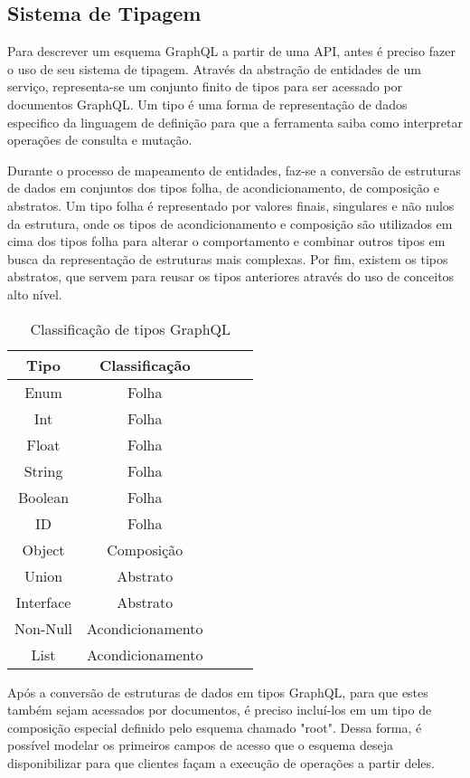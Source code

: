 \subsection[Sistema de Tipagem]{Sistema de Tipagem}

Para descrever um esquema GraphQL a partir de uma API, antes é preciso fazer o uso de seu sistema de tipagem. Através da abstração de entidades de um serviço, representa-se um conjunto finito de tipos para ser acessado por documentos GraphQL. Um tipo é uma forma de representação de dados especifico da linguagem de definição para que a ferramenta saiba como interpretar operações de consulta e mutação.

Durante o processo de mapeamento de entidades, faz-se a conversão de estruturas de dados em conjuntos dos tipos folha, de acondicionamento, de composição e abstratos. Um tipo folha é representado por valores finais, singulares e não nulos da estrutura, onde os tipos de acondicionamento e composição são utilizados em cima dos tipos folha para alterar o comportamento e combinar outros tipos em busca da representação de estruturas mais complexas. Por fim, existem os tipos abstratos, que servem para reusar os tipos anteriores através do uso de conceitos alto nível.

\begin{table}[H]
  \centering
  \begin{tabular}{|c|c|c|c|c|}
    \hline
    Tipo & Classificação \\
    \hline
    Enum & Folha \\
    \hline
    Int & Folha \\
    \hline
    Float & Folha \\
    \hline
    String & Folha \\
    \hline
    Boolean & Folha \\
    \hline
    ID & Folha \\
    \hline
    Object & Composição \\
    \hline
    Union & Abstrato \\
    \hline
    Interface & Abstrato \\
    \hline    
    Non-Null & Acondicionamento \\
    \hline
  	List & Acondicionamento \\
    \hline
  \end{tabular}
  \caption{Classificação de tipos GraphQL}
\end{table}

Após a conversão de estruturas de dados em tipos GraphQL, para que estes também sejam acessados por documentos, é preciso incluí-los em um tipo de composição especial definido pelo esquema chamado "root". Dessa forma, é possível modelar os primeiros campos de acesso que o esquema deseja disponibilizar para que clientes façam a execução de operações a partir deles.

